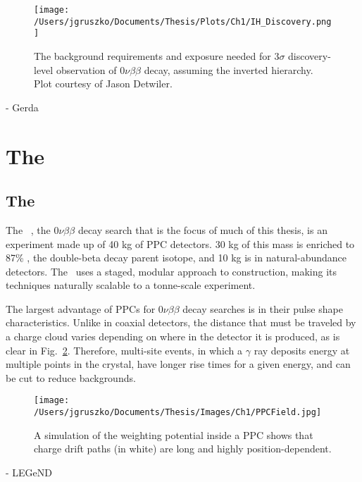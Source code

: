 \begin{figure}[h]
\hfil \texttt{[image: /Users/jgruszko/Documents/Thesis/Plots/Ch1/IH\_Discovery.png]} \hfil
\caption{The background requirements and exposure needed for $3\sigma$ discovery-level observation of $0\nu\beta\beta$ decay, assuming the inverted hierarchy. Plot courtesy of Jason Detwiler.}
\label{IH_Discovery}
\end{figure}

	- Gerda
\section{The \MJDemo}
\subsection{The \MJ~\MJDemo}
The \MJ~\MJDemo, the $0\nu\beta\beta$ decay search that is the focus of much of this thesis, is an experiment made up of 40 kg of PPC detectors. 30 kg of this mass is enriched to 87\% , the double-beta decay parent isotope, and 10 kg is in natural-abundance detectors. The \MJDemo~uses a staged, modular approach to construction, making its techniques naturally scalable to a tonne-scale experiment. 

The largest advantage of PPCs for $0\nu\beta\beta$ decay searches is in their pulse shape characteristics. Unlike in coaxial detectors, the distance that must be traveled by a charge cloud varies depending on where in the detector it is produced, as is clear in Fig.~\ref{PPCField}. Therefore, multi-site events, in which a $\gamma$ ray deposits energy at multiple points in the crystal, have longer rise times for a given energy, and can be cut to reduce backgrounds. 

\begin{figure}[h]
\hfil \texttt{[image: /Users/jgruszko/Documents/Thesis/Images/Ch1/PPCField.jpg]} \hfil
\caption{A simulation of the weighting potential inside a PPC shows that charge drift paths (in white) are long and highly position-dependent. \cite{Aalseth2011}}
\label{PPCField}
\end{figure}

	- LEGeND

